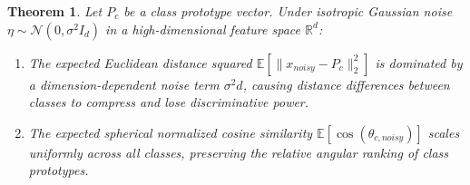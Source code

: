 \documentclass{article}
\newtheorem{theorem}{Theorem}[section]
\theoremstyle{definition}
\theoremstyle{remark}
\begin{document}
\begin{theorem}
Let $P_c$ be a class prototype vector. Under isotropic Gaussian noise $\eta \sim \mathcal{N}(0, \sigma^2 I_d)$ in a high-dimensional feature space $\mathbb{R}^d$:
\begin{enumerate}
    \item The expected Euclidean distance squared $\mathbb{E}[\|x_{noisy} - P_c\|_2^2]$ is dominated by a dimension-dependent noise term $\sigma^2 d$, causing distance differences between classes to compress and lose discriminative power.
    \item The expected spherical normalized cosine similarity $\mathbb{E}[\cos(\theta_{c, noisy})]$ scales uniformly across all classes, preserving the relative angular ranking of class prototypes.
\end{enumerate}
\end{theorem}
\end{document}
